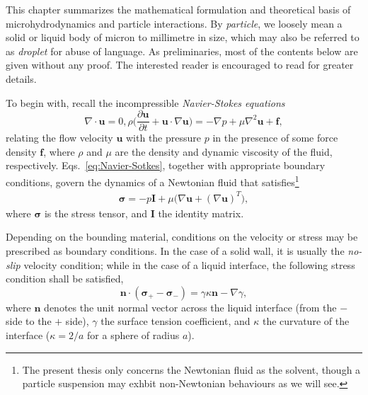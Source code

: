 This chapter summarizes the mathematical formulation and theoretical basis of microhydrodynamics and particle interactions.
By \emph{particle}, we loosely mean a solid or liquid body of micron to millimetre in size, which may also be referred to as \emph{droplet} for abuse of language.
As preliminaries, most of the contents below are given without any proof. The interested reader is encouraged to read \cite{Batchelor, hb, ps, kim_karrila, graham_2018} for greater details.

\bigskip

To begin with, recall the incompressible \emph{Navier-Stokes equations}
\begin{subequations} \label{eq:Navier-Sotkes}
 \begin{equation}
   \nabla \cdot {\bm u} = 0,
  \label{eq:div-free}
 \end{equation}
 \begin{equation}
   \rho \bigg(\frac{\partial {\bm u}}{\partial t} + {\bm u} \cdot \nabla {\bm u} \bigg) = -\nabla p + \mu \nabla ^2  {\bm u} + {\bm f},
  \label{eq:NS}
 \end{equation}
\end{subequations}
relating the flow velocity $\bm u$ with the pressure $p$ in the presence of some force density $\bm f$, where $\rho$ and $\mu$ are the density and dynamic viscosity of the fluid, respectively.
Eqs.\ \eqref{eq:Navier-Sotkes}, together with appropriate boundary conditions, govern the dynamics of a Newtonian fluid that satisfies\footnote{The present thesis only concerns the Newtonian fluid as the solvent, though a particle suspension may exhbit non-Newtonian behaviours as we will see.}
\begin{equation}
 \begin{aligned}
   {\bm \sigma} = -p {\bm I}+ \mu \bigg( \nabla {\bm u} + (\nabla {\bm u})^T \bigg),
 \end{aligned}
\end{equation}
where $\bm \sigma$ is the stress tensor, and $\bm I$ the identity matrix.

Depending on the bounding material, conditions on the velocity or stress may be prescribed as boundary conditions. In the case of a solid wall, it is usually the \emph{no-slip} velocity condition; while in the case of a liquid interface, the following stress condition shall be satisfied,
\begin{equation} \label{eq:stress-bc}
  {\bm n} \cdot ({\bm \sigma}_+ - {\bm \sigma}_- )  = \gamma \kappa {\bm n} - \nabla \gamma,
\end{equation}
where $\bm n$ denotes the unit normal vector across the liquid interface (from the $-$ side to the $+$ side), $\gamma$ the surface tension coefficient, and $\kappa$ the curvature of the interface (\eg $\kappa=2/a$ for a sphere of radius $a$). 


